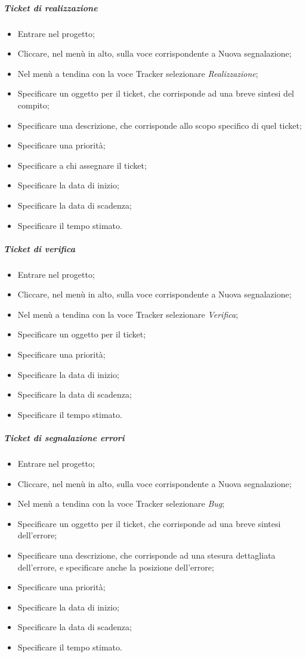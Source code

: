 \subparagraph{Ticket di realizzazione}
\begin{itemize}
\item Entrare nel progetto;
\item Cliccare, nel menù in alto, sulla voce corrispondente a Nuova segnalazione;
\item Nel menù a tendina con la voce Tracker selezionare \textit{Realizzazione};
\item Specificare un oggetto per il ticket, che corrisponde ad una breve sintesi del compito;
\item Specificare una descrizione, che corrisponde allo scopo specifico di quel ticket;
\item Specificare una priorità;
\item Specificare a chi assegnare il ticket;
\item Specificare la data di inizio;
\item Specificare la data di scadenza;
\item Specificare il tempo stimato.
\end{itemize}

\subparagraph{Ticket di verifica}
\label{ticket_verifica}
\begin{itemize}
\item Entrare nel progetto;
\item Cliccare, nel menù in alto, sulla voce corrispondente a Nuova segnalazione;
\item Nel menù a tendina con la voce Tracker selezionare \textit{Verifica};
\item Specificare un oggetto per il ticket;
\item Specificare una priorità;
\item Specificare la data di inizio;
\item Specificare la data di scadenza;
\item Specificare il tempo stimato.
\end{itemize}


\subparagraph{Ticket di segnalazione errori}
\label{ticket_bug}
\begin{itemize}
\item Entrare nel progetto;
\item Cliccare, nel menù in alto, sulla voce corrispondente a Nuova segnalazione;
\item Nel menù a tendina con la voce Tracker selezionare \textit{Bug};
\item Specificare un oggetto per il ticket, che corrisponde ad una breve sintesi dell'errore;
\item Specificare una descrizione, che corrisponde ad una stesura dettagliata dell'errore, e specificare anche la posizione dell'errore;
\item Specificare una priorità;
\item Specificare la data di inizio;
\item Specificare la data di scadenza;
\item Specificare il tempo stimato.
\end{itemize}

